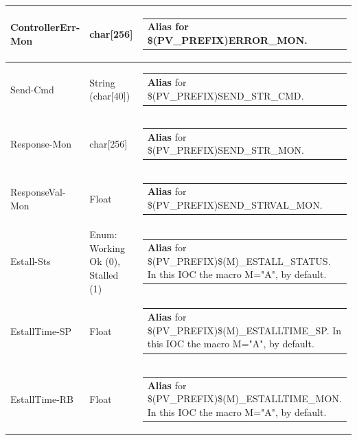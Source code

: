\documentclass[openany]{article}
\begin{document}
\begin{longtable}{| m{4.5cm} m{2.5cm}  m{8.5cm} |}
        ControllerErr-Mon & char[256] & \begin{tabular}{@{}m{6cm}@{}}
                \textbf{\color{blue} Alias} for \$(PV\_PREFIX)ERROR\_MON.
            \end{tabular} \hypertarget{pv:send-cmd}{}\\ \hline
        Send-Cmd & String (char[40]) & \begin{tabular}{@{}m{6cm}@{}}
                \textbf{\color{blue} Alias} for \$(PV\_PREFIX)SEND\_STR\_CMD.
            \end{tabular} \hypertarget{pv:response-mon}{}\\ \hline
        Response-Mon & char[256] & \begin{tabular}{@{}m{6cm}@{}}
                \textbf{\color{blue} Alias} for \$(PV\_PREFIX)SEND\_STR\_MON.
            \end{tabular} \hypertarget{pv:response-val-mon}{}\\ \hline
        ResponseVal-Mon & Float & \begin{tabular}{@{}m{6cm}@{}}
                \textbf{\color{blue} Alias} for \$(PV\_PREFIX)SEND\_STRVAL\_MON.
            \end{tabular} \hypertarget{pv:estall}{}\\ \hline
        Estall-Sts & Enum: Working Ok (0), Stalled (1) & \begin{tabular}{@{}m{6cm}@{}}
                \textbf{\color{blue} Alias} for \$(PV\_PREFIX)\$(M)\_ESTALL\_STATUS. In this IOC the macro M="A", by default.
            \end{tabular} \hypertarget{pv:estall-time}{}\\ \hline
        EstallTime-SP & Float & \begin{tabular}{@{}m{6cm}@{}}
                \textbf{\color{blue} Alias} for \$(PV\_PREFIX)\$(M)\_ESTALLTIME\_SP. In this IOC the macro M="A", by default.
            \end{tabular} \hypertarget{}{}\\ \hline
        EstallTime-RB & Float & \begin{tabular}{@{}m{6cm}@{}}
                \textbf{\color{blue} Alias} for \$(PV\_PREFIX)\$(M)\_ESTALLTIME\_MON. In this IOC the macro M="A", by default.
            \end{tabular} \hypertarget{pv:step-smooth}{}\\ \hline

\end{longtable}
\end{document}
